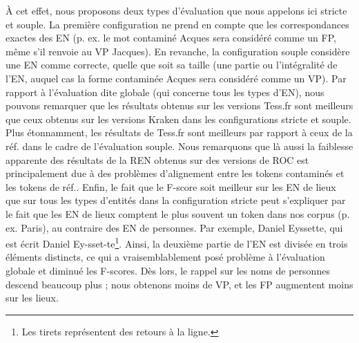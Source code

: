 À cet effet, nous proposons deux types d'évaluation que nous appelons ici \og{}stricte\fg{} et \og{}souple\fg{}. La première configuration ne prend en compte que les correspondances exactes des EN (p. ex. le mot contaminé \og{}Acques\fg{} sera considéré comme un FP, même s'il renvoie au VP \og{}Jacques\fg{}). En revanche, la configuration \og{}souple\fg{} considère une EN comme correcte, quelle que soit sa taille (une partie ou l'intégralité de l'EN, auquel cas la forme contaminée \og{}Acques\fg{} sera considéré comme un VP). Par rapport à l'évaluation dite \og{}globale\fg{} (qui concerne tous les types d'EN), nous pouvons remarquer que les résultats obtenus sur les versions Tess.fr sont meilleurs que ceux obtenus sur les versions Kraken dans les configurations stricte et souple.
  Plus étonnamment, les résultats de Tess.fr sont meilleurs par rapport à ceux de la réf. dans le cadre de l'évaluation souple.
 Nous remarquons que là aussi la faiblesse apparente des résultats de la REN obtenus sur des versions de ROC est principalement due à des problèmes d'alignement entre les tokens contaminés et les tokens de réf.. 
  Enfin, le fait que le F-score soit meilleur sur les EN de lieux que sur tous les types d'entités dans la configuration stricte peut s'expliquer par le fait que les EN de lieux comptent le plus souvent un token dans nos corpus (p. ex. \og{}Paris\fg{}), au contraire des EN de personnes. Par exemple, \og{}Daniel Eyssette\fg{}, qui est écrit \og{}Daniel Ey-sset-te\fg{}\footnote{Les tirets représentent des retours à la ligne.}. Ainsi, la deuxième partie de l'EN est divisée en trois éléments distincts, ce qui a vraisemblablement posé problème à l'évaluation globale et diminué les F-scores. Dès lors, le rappel sur les noms de personnes descend beaucoup plus ; nous obtenons moins de VP, et les FP augmentent moins sur les lieux.


